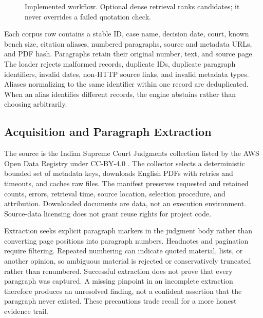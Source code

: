 \documentclass[conference]{IEEEtran}
\begin{document}
\begin{figure}[t]\centering
\setlength{\fboxsep}{6pt}
\caption{Implemented workflow. Optional dense retrieval ranks candidates; it never overrides a failed quotation check.}\label{fig:pipeline}
\end{figure}

Each corpus row contains a stable ID, case name, decision date, court, known bench size, citation aliases, numbered paragraphs, source and metadata URLs, and PDF hash. Paragraphs retain their original number, text, and source page. The loader rejects malformed records, duplicate IDs, duplicate paragraph identifiers, invalid dates, non-HTTP source links, and invalid metadata types. Aliases normalizing to the same identifier within one record are deduplicated. When an alias identifies different records, the engine abstains rather than choosing arbitrarily.

\subsection{Acquisition and Paragraph Extraction}
The source is the Indian Supreme Court Judgments collection listed by the AWS Open Data Registry under CC-BY-4.0 \cite{dataset}. The collector selects a deterministic bounded set of metadata keys, downloads English PDFs with retries and timeouts, and caches raw files. The manifest preserves requested and retained counts, errors, retrieval time, source location, selection procedure, and attribution. Downloaded documents are data, not an execution environment. Source-data licensing does not grant reuse rights for project code.

Extraction seeks explicit paragraph markers in the judgment body rather than converting page positions into paragraph numbers. Headnotes and pagination require filtering. Repeated numbering can indicate quoted material, lists, or another opinion, so ambiguous material is rejected or conservatively truncated rather than renumbered. Successful extraction does not prove that every paragraph was captured. A missing pinpoint in an incomplete extraction therefore produces an unresolved finding, not a confident assertion that the paragraph never existed. These precautions trade recall for a more honest evidence trail.
\end{document}
